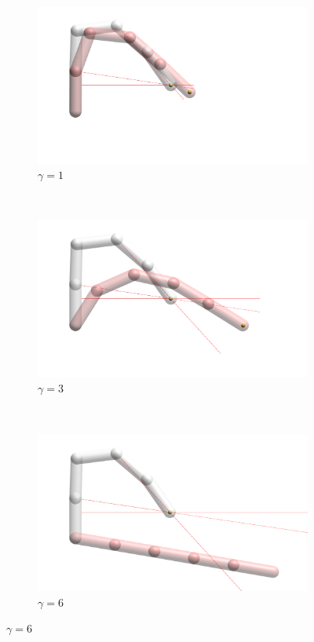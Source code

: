\begin{figure}[h]
    
    \begin{subfigure}[b]{.3\textwidth}
        \includegraphics[width=\textwidth]{Figures/distortions/distortions1.png}
        \caption{$\gamma = 1$}
    \end{subfigure}
    ~
    \begin{subfigure}[b]{.3\textwidth}
        \includegraphics[width=\textwidth]{Figures/distortions/distortions3.png}
        \caption{$\gamma = 3$}
    \end{subfigure}
    ~
    \begin{subfigure}[b]{.3\textwidth}
        \includegraphics[width=\textwidth]{Figures/distortions/distortions6.png}
        \caption{$\gamma = 6$}
    \end{subfigure}
        

\end{figure}
